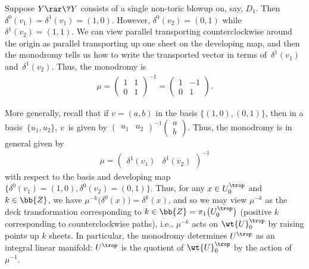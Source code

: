 \begin{eg} \label{focusfocus}Suppose $Y\rar \?{Y}$ consists of a single non-toric blowup on, say, $D_1$. Then $\delta^0(v_1)=\delta^1(v_1)=(1,0)$. However, $\delta^0(v_2) = (0,1)$ while $\delta^1(v_2) = (1,1)$. We can view parallel transporting counterclockwise around the origin as parallel transporting up one sheet on the developing map, and then the monodromy tells us how to write the transported vector in terms of~$\delta^1(v_1)$ and~$\delta^1(v_2)$. Thus, the monodromy is
\begin{gather*}
	\mu=\left(\begin{matrix}
		1 &1 \\
		0 &1
		\end{matrix}\right)^{-1}
	=	\left(\begin{matrix}
		1 &-1 \\
		0 &1
		\end{matrix}\right).	
\end{gather*}
\end{eg}

More generally, recall that if $v=(a,b)$ in the basis $\{(1,0), (0,1)\}$, then in a basis~$\{u_1,u_2\}$, $v$~is given by $\left(\begin{smallmatrix} u_1 & u_2 \end{smallmatrix} \right)^{-1}\left(\begin{smallmatrix} a \\ b \end{smallmatrix} \right)$. Thus, the monodromy is in general given by
\begin{gather*}
 \mu=\left(\begin{matrix}\delta^1(v_{1}) & \delta^1(v_{2}) \end{matrix} \right)^{-1}
\end{gather*} with respect to the basis and developing map $\big\{\delta^0(v_{1})=(1,0),\delta^0(v_{2})=(0,1)\big\}$. Thus, for any \mbox{$x\in U^{\trop}_0$} and $k\in \bb{Z}$, we have $\mu^{-k}\big(\delta^0(x)\big)=\delta^k(x)$, and so we may view $\mu^{-k}$ as the deck transformation corresponding to $k\in \bb{Z}=\pi_1\big(U^{\trop}_0\big)$ (positive $k$ corresponding to counterclockwise paths), i.e., $\mu^{-k}$ acts on $\wt{U}_0^{\trop}$ by raising points up $k$ sheets. In particular, the monodromy determines $U^{\trop}$ as an integral linear manifold: $U^{\trop}$ is the quotient of $\wt{U}_0^{\trop}$ by the action of~$\mu^{-1}$.

